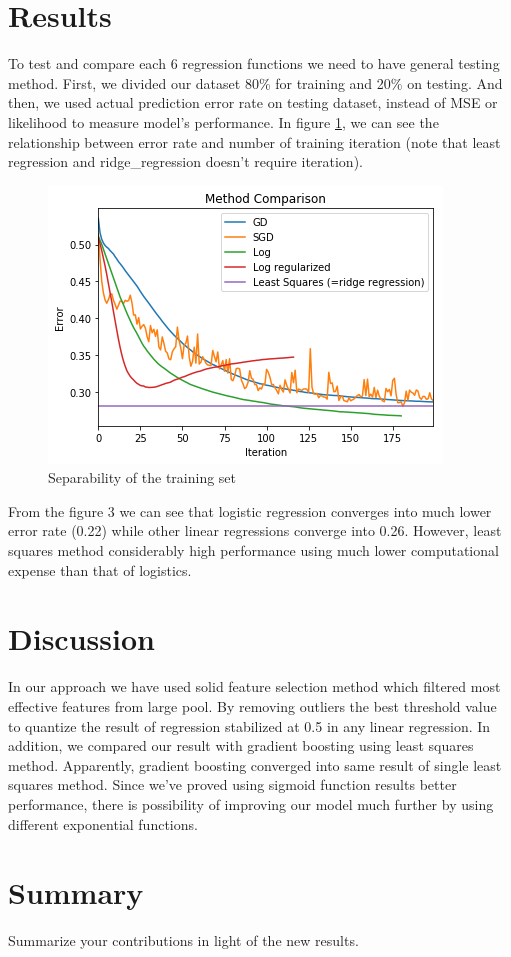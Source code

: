 \documentclass[10pt,conference,compsocconf]{IEEEtran}
\begin{document}
\section{Results}
\label{S1}
To test and compare each 6 regression functions we need to have general testing method. First, we divided our dataset 80\% for training and 20\% on testing. And then, we used actual prediction error rate on testing dataset, instead of MSE or likelihood to measure model's performance. In figure \ref{fig3}, we can see the relationship between error rate and number of training iteration (note that least regression and ridge_regression doesn't require iteration). 

\begin{tiny}
	\begin{figure}[b]
		\includegraphics[scale=0.5]{MethodComp.png}   
		\caption{Separability of the training set }
		\label{fig3}    
	\end{figure}
\end{tiny}

From the figure 3 we can see that logistic regression converges into much lower error rate (0.22) while other linear regressions converge into 0.26. However, least squares method considerably high performance using much lower computational expense than that of logistics.
\section{Discussion}
\label{S1}
  In our approach we have used solid feature selection method which filtered most effective features from large pool. By removing outliers the best threshold value to quantize the result of regression stabilized at 0.5 in any linear regression. In addition, we compared our result with gradient boosting using least squares method. Apparently, gradient boosting converged into same result of single least squares method.
  Since we've proved using sigmoid function results better performance, there is possibility of improving our model much further by using different exponential functions.
\section{Summary}
\label{S1}
  Summarize your contributions in light of the new
results.
\end{document}
